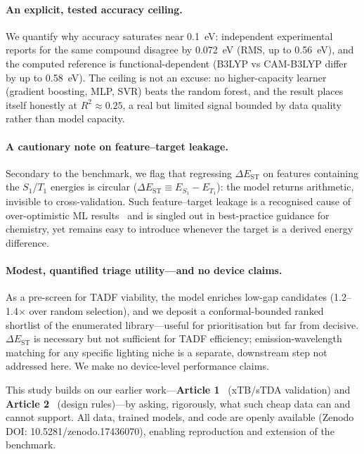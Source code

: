 \paragraph{An explicit, tested accuracy ceiling.}
We quantify why accuracy saturates near \qty{0.1}{\electronvolt}: independent
experimental reports for the same compound disagree by \qty{0.072}{\electronvolt}
(RMS, up to \qty{0.56}{\electronvolt}), and the computed reference is
functional-dependent (B3LYP vs CAM-B3LYP differ by up to
\qty{0.58}{\electronvolt}). The ceiling is not an excuse: no higher-capacity learner
(gradient boosting, MLP, SVR) beats the random forest, and the result places itself
honestly at $R^2 \approx 0.25$, a real but limited signal bounded by data quality
rather than model capacity.

\paragraph{A cautionary note on feature--target leakage.}
Secondary to the benchmark, we flag that regressing $\Delta E_\text{ST}$ on features
containing the $S_1$/$T_1$ energies is circular ($\Delta E_\text{ST} \equiv E_{S_1} -
E_{T_1}$): the model returns arithmetic, invisible to cross-validation. Such
feature--target leakage is a recognised cause of over-optimistic ML results~\cite{Kapoor2023}
and is singled out in best-practice guidance for chemistry,\cite{Artrith2021} yet remains
easy to introduce whenever the target is a derived energy difference.

\paragraph{Modest, quantified triage utility---and no device claims.}
As a pre-screen for TADF viability, the model enriches low-gap candidates
(\numrange{1.2}{1.4}$\times$ over random selection), and we deposit a conformal-bounded
ranked shortlist of the enumerated library---useful for prioritisation but far from
decisive. $\Delta E_\text{ST}$ is necessary but not sufficient for TADF efficiency;
emission-wavelength matching for any specific lighting niche is a separate, downstream
step not addressed here. We make no device-level performance claims.

This study builds on our earlier work---\textbf{Article 1}~\cite{Tchapet2024_xTB}
(xTB/sTDA validation) and \textbf{Article 2}~\cite{Tchapet2024_DataDriven} (design
rules)---by asking, rigorously, what such cheap data can and cannot support.
All data, trained models, and code are openly available (Zenodo DOI:
10.5281/zenodo.17436070), enabling reproduction and extension of the benchmark.
